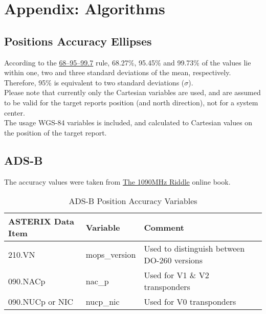 \section{Appendix: Algorithms}
\label{sec:appendix_algorithms}  

\subsection{Positions Accuracy Ellipses}
\label{sec:algo_position_accuracy_ellipses} 

According to the \href{https://en.wikipedia.org/wiki/68%E2%80%9395%E2%80%9399.7_rule}{68–95–99.7} rule, 68.27\%, 95.45\% and 99.73\% of the values lie within one, two and three standard deviations of the mean, respectively. \\

Therefore, 95\% is equivalent to two standard deviations ($\sigma$). \\

Please note that currently only the Cartesian variables are used, and are assumed to be valid for the target reports position (and north direction), not for a system center. \\

The usage WGS-84 variables is included, and calculated to Cartesian values on the position of the target report.

\subsection{ADS-B}

The accuracy values were taken from \href{https://mode-s.org/decode/adsb/uncertainty.html}{The 1090MHz Riddle} online book.

\begin{center}
 \begin{table}[H]
  \begin{tabularx}{\textwidth}{ | X | l | l | }
    \hline
    \textbf{ASTERIX Data Item} & \textbf{Variable} & \textbf{Comment} \\ \hline
    210.VN & mops\_version & Used to distinguish between DO-260 versions \\ \hline
    090.NACp & nac\_p  & Used for V1 \& V2 transponders \\ \hline
    090.NUCp or NIC & nucp\_nic  & Used for V0 transponders \\ \hline
  \end{tabularx}
  \caption{ADS-B Position Accuracy Variables}
\end{table}
\end{center}

